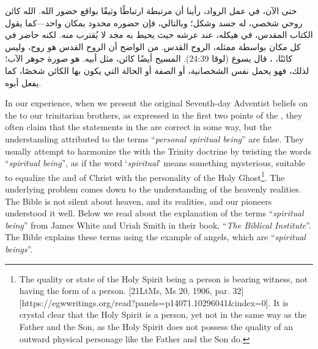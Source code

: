 حتى الآن، في عمل الرواد، رأينا أن  مرتبطة ارتباطًا وثيقًا بواقع حضور الله. الله كائن روحي شخصي، له جسد وشكل؛ وبالتالي، فإن حضوره محدود بمكان واحد—كما يقول الكتاب المقدس، في هيكله، عند عرشه حيث يحيط به مجد لا يُقترب منه. لكنه حاضر في كل مكان بواسطة ممثله، الروح القدس. من الواضح أن الروح القدس هو روح، وليس كائنًا، ، قال يسوع (لوقا 24:39). المسيح أيضًا كائن، مثل أبيه. هو صورة جوهر الآب؛ لذلك، فهو يحمل نفس الشخصانية، أو الصفة أو الحالة التي يكون بها الكائن شخصًا، كما يفعل أبوه.


In our experience, when we present the original Seventh-day Adventist beliefs on the  to our trinitarian brothers, as expressed in the first two points of the , they often claim that the statements in the  are correct in some way, but the understanding attributed to the terms “\textit{personal spiritual being}” are false. They usually attempt to harmonize the  with the Trinity doctrine by twisting the words “\textit{spiritual being}”, as if the word ‘\textit{spiritual}’ means something mysterious, suitable to equalize the  and of Christ with the personality of the Holy Ghost\footnote{The quality or state of the Holy Spirit being a person is bearing witness, not having the form of a person. [21LtMs, Ms 20, 1906, par. 32][https://egwwritings.org/read?panels=p14071.10296041&index=0]. It is crystal clear that the Holy Spirit is a person, yet not in the same way as the Father and the Son, as the Holy Spirit does not possess the quality of an outward physical personage like the Father and the Son do.}. The underlying problem comes down to the understanding of the heavenly realities. The Bible is not silent about heaven, and its realities, and our pioneers understood it well. Below we read about the explanation of the terms “\textit{spiritual being}” from James White and Uriah Smith in their book, “\textit{The Biblical Institute}”. The Bible explains these terms using the example of angels, which are “\textit{spiritual beings}”.


